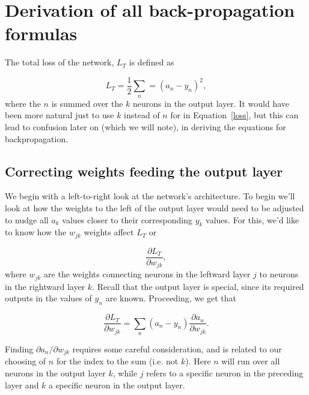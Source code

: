 \documentclass[12pt]{article}
\begin{document}
 
 
 









 


\section{Derivation of all back-propagation formulas}

The total loss of the network, $L_T$ is defined as

\begin{equation}
L_T=\frac{1}{2}\sum_n=(a_n - y_n)^2,
\label{loss}
\end{equation}
where the $n$ is summed over the $k$ neurons in the output layer.  It would have been more natural just to use $k$ instead of $n$ for in Equation~\ref{loss}, but this can lead to confusion later on (which we will note), in deriving the equations for backpropagation.

\subsection{Correcting weights feeding the output layer}

We begin with a left-to-right look at the network's architecture.  To begin we'll look at how the weights to the left of the output layer would need to be adjusted to nudge all $a_k$ values closer to their corresponding $y_k$ values.  For this, we'd like to know how the $w_{jk}$ weights affect $L_T$ or

\begin{equation}
\frac{\partial L_T}{\partial w_{jk}},
\end{equation}
where $w_{jk}$ are the weights connecting neurons in the leftward layer $j$ to neurons in the rightward layer $k$. Recall that the output layer is special, since its required outputs in the values of $y_n$ are known. Proceeding, we get that

\begin{equation}
\frac{\partial L_T}{\partial w_{jk}} = \sum_n (a_n-y_n)\frac{\partial a_n}{\partial w_{jk}}.
\label{jk_deriv}
\end{equation}

\noindent Finding $\partial a_n/\partial w_{jk}$ requires some careful consideration, and is related to our choosing of $n$ for the index to the sum (i.e. not $k$).  Here $n$ will run over all neurons in the output layer $k$, while $j$ refers to a specific neuron in the preceding layer and $k$ a specific neuron in the output layer.  
\end{document}
